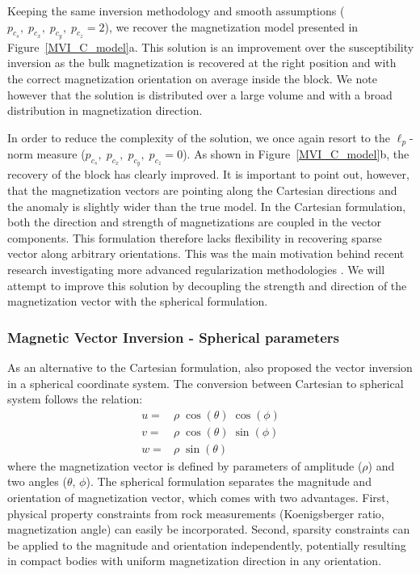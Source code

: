 \documentclass[paper]{geophysics}
\begin{document}
Keeping the same inversion methodology and smooth assumptions ($p_{c_s}, \;p_{c_x},\; p_{c_y},\; p_{c_z} = 2$), we recover the magnetization model presented in Figure~\ref{MVI_C_model}a.
This solution is an improvement over the susceptibility inversion as the bulk magnetization is recovered at the right position and with the correct magnetization orientation on average inside the block. We note however that the solution is distributed over a large volume and with a broad distribution in magnetization direction.

In order to reduce the complexity of the solution, we once again resort to the $\ell_p$-norm measure ($p_{c_s}, \;p_{c_x},\; p_{c_y},\; p_{c_z} = 0$). As shown in Figure~\ref{MVI_C_model}b, the recovery of the block has clearly improved. It is important to point out, however, that the magnetization vectors are pointing along the Cartesian directions and the anomaly is slightly wider than the true model. In the Cartesian formulation, both the direction and strength of magnetizations are coupled in the vector components. This formulation therefore lacks flexibility in recovering sparse vector along arbitrary orientations. This was the main motivation behind recent research investigating more advanced regularization methodologies \cite[~p.~101]{Zhu2015, Liu2015, Fournier2015}. We will attempt to improve this solution by decoupling the strength and direction of the magnetization vector with the spherical formulation.

\subsubsection{Magnetic Vector Inversion - Spherical parameters}
As an alternative to the Cartesian formulation, \cite{LelievreOldenburg2009} also proposed the vector inversion in a spherical coordinate system.
The conversion between Cartesian to spherical system follows the relation:
\begin{equation}\label{eq:Cart_to_Spherical}
\begin{split}
u = & \rho \; \cos(\theta)\;\cos(\phi) \\
v = & \rho \; \cos(\theta)\;\sin(\phi) \\
w = & \rho \; \sin(\theta)
\end{split}
\end{equation}
where the magnetization vector is defined by parameters of amplitude (${\rho}$) and two angles (${\theta}$, ${\phi}$).
The spherical formulation separates the magnitude and orientation of magnetization vector, which comes with two advantages. First, physical property constraints from rock measurements (Koenigsberger ratio, magnetization angle) can easily be incorporated. Second, sparsity constraints can be applied to the magnitude and orientation independently, potentially resulting in compact bodies with uniform magnetization direction in any orientation.
\end{document}
